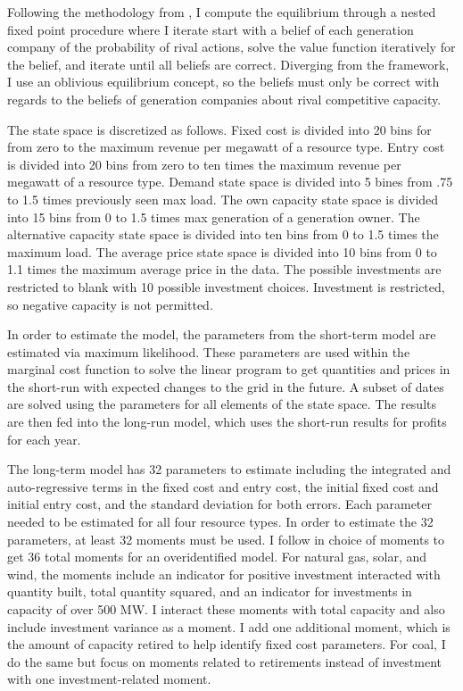 \documentclass[12pt]{article}
\begin{document}
Following the methodology from \cite{gowrisankaran2024computable}, I compute the equilibrium through a nested fixed point procedure where I iterate start with a belief of each generation company of the probability of rival actions, solve the value function iteratively for the belief, and iterate until all beliefs are correct. Diverging from the framework, I use an oblivious equilibrium concept, so the beliefs must only be correct with regards to the beliefs of generation companies about rival competitive capacity.

The state space is discretized as follows. Fixed cost is divided into 20 bins for from zero to the maximum revenue per megawatt of a resource type. Entry cost is divided into 20 bins from zero to ten times the maximum revenue per megawatt of a resource type. Demand state space is divided into 5 bines from .75 to 1.5 times previously seen max load. The own capacity state space is divided into 15 bins from 0 to 1.5 times max generation of a generation owner. The alternative capacity state space is divided into ten bins from 0 to 1.5 times the maximum load. The average price state space is divided into 10 bins from 0 to 1.1 times the maximum average price in the data. 
The possible investments are restricted to blank with 10 possible investment choices. Investment is restricted, so negative capacity is not permitted.

In order to estimate the model, the parameters from the short-term model are estimated via maximum likelihood. These parameters are used within the marginal cost function to solve the linear program to get quantities and prices in the short-run with expected changes to the grid in the future. A subset of dates are solved using the parameters for all elements of the state space. The results are then fed into the long-run model, which uses the short-run results for profits for each year.

The long-term model has 32 parameters to estimate including the integrated and auto-regressive terms in the fixed cost and entry cost, the initial fixed cost and initial entry cost, and the standard deviation for both errors. Each parameter needed to be estimated for all four resource types. In order to estimate the 32 parameters, at least 32 moments must be used. I follow \cite{gowrisankaran2024energy} in choice of moments to get 36 total moments for an overidentified model. For natural gas, solar, and wind, the moments include an indicator for positive investment interacted with quantity built, total quantity squared, and an indicator for investments in capacity of over 500 MW. I interact these moments with total capacity and also include investment variance as a moment. I add one additional moment, which is the amount of capacity retired to help identify fixed cost parameters. For coal, I do the same but focus on moments related to retirements instead of investment with one investment-related moment.
\end{document}
